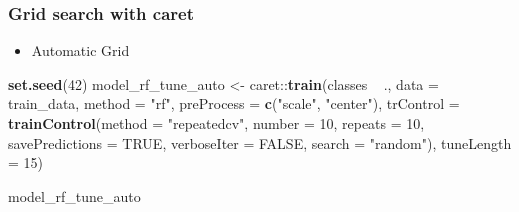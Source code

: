 \documentclass[]{article}
\newenvironment{Shaded}{\begin{snugshade}}{\end{snugshade}}
\newcommand{\KeywordTok}[1]{\textcolor[rgb]{0.13,0.29,0.53}{\textbf{{#1}}}}
\newcommand{\DataTypeTok}[1]{\textcolor[rgb]{0.13,0.29,0.53}{{#1}}}
\newcommand{\DecValTok}[1]{\textcolor[rgb]{0.00,0.00,0.81}{{#1}}}
\newcommand{\StringTok}[1]{\textcolor[rgb]{0.31,0.60,0.02}{{#1}}}
\newcommand{\OtherTok}[1]{\textcolor[rgb]{0.56,0.35,0.01}{{#1}}}
\newcommand{\NormalTok}[1]{{#1}}
\providecommand{\tightlist}{%
  \setlength{\itemsep}{0pt}\setlength{\parskip}{0pt}}
\begin{document}
\begin{Shaded}
\end{Shaded}

\subsubsection{Grid search with caret}\label{grid-search-with-caret}

\begin{itemize}
\tightlist
\item
  Automatic Grid
\end{itemize}

\begin{Shaded}
\begin{Highlighting}[]
\KeywordTok{set.seed}\NormalTok{(}\DecValTok{42}\NormalTok{)}
\NormalTok{model_rf_tune_auto <-}\StringTok{ }\NormalTok{caret::}\KeywordTok{train}\NormalTok{(classes ~}\StringTok{ }\NormalTok{.,}
                         \DataTypeTok{data =} \NormalTok{train_data,}
                         \DataTypeTok{method =} \StringTok{"rf"}\NormalTok{,}
                         \DataTypeTok{preProcess =} \KeywordTok{c}\NormalTok{(}\StringTok{"scale"}\NormalTok{, }\StringTok{"center"}\NormalTok{),}
                         \DataTypeTok{trControl =} \KeywordTok{trainControl}\NormalTok{(}\DataTypeTok{method =} \StringTok{"repeatedcv"}\NormalTok{, }
                                                  \DataTypeTok{number =} \DecValTok{10}\NormalTok{, }
                                                  \DataTypeTok{repeats =} \DecValTok{10}\NormalTok{, }
                                                  \DataTypeTok{savePredictions =} \OtherTok{TRUE}\NormalTok{, }
                                                  \DataTypeTok{verboseIter =} \OtherTok{FALSE}\NormalTok{,}
                                                  \DataTypeTok{search =} \StringTok{"random"}\NormalTok{),}
                         \DataTypeTok{tuneLength =} \DecValTok{15}\NormalTok{)}
\end{Highlighting}
\end{Shaded}

\begin{Shaded}
\begin{Highlighting}[]
\NormalTok{model_rf_tune_auto}
\end{Highlighting}
\end{Shaded}
\end{document}
